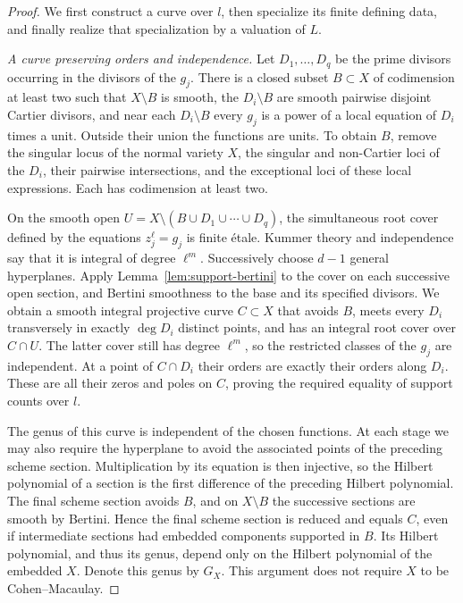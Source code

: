 \begin{proof}
We first construct a curve over $l$, then specialize its finite defining
data, and finally realize that specialization by a valuation of $L$.

\emph{A curve preserving orders and independence.}
Let $D_1,\ldots,D_q$ be the prime divisors occurring in the divisors of
the $g_j$.  There is a closed subset $B\subset X$ of codimension at least
two such that $X\setminus B$ is smooth, the $D_i\setminus B$ are smooth
pairwise disjoint Cartier divisors, and near each $D_i\setminus B$ every
$g_j$ is a power of a local equation of $D_i$ times a unit.
Outside their union the functions are units.  To obtain $B$, remove the
singular locus of the normal variety $X$, the singular and non-Cartier
loci of the $D_i$, their pairwise intersections, and the exceptional
loci of these local expressions.  Each has codimension at least two.

On the smooth open
$U=X\setminus(B\cup D_1\cup\cdots\cup D_q)$, the simultaneous root
cover defined by the equations $z_j^\ell=g_j$ is finite \'{e}tale.
Kummer theory and independence say that it is integral of degree
$\ell^m$.  Successively choose $d-1$ general hyperplanes.  Apply
Lemma~\ref{lem:support-bertini} to the cover on each successive open
section, and Bertini smoothness to the base and its specified divisors.
We obtain a smooth integral projective curve $C\subset X$ that avoids
$B$, meets every $D_i$ transversely in exactly $\deg D_i$ distinct
points, and has an integral root cover over $C\cap U$.
The latter cover still has degree $\ell^m$, so the restricted classes
of the $g_j$ are independent.  At a point of $C\cap D_i$ their orders
are exactly their orders along $D_i$.  These are all their zeros and
poles on $C$, proving the required equality of support counts over $l$.

The genus of this curve is independent of the chosen functions.
At each stage we may also require the hyperplane to avoid the associated
points of the preceding scheme section.  Multiplication by its equation
is then injective, so the Hilbert polynomial of a section is the first
difference of the preceding Hilbert polynomial.  The final scheme
section avoids $B$, and on $X\setminus B$ the successive sections are
smooth by Bertini.  Hence the final scheme section is reduced and equals
$C$, even if intermediate sections had embedded components supported
in $B$.
Its Hilbert polynomial, and thus its genus, depend only on the Hilbert
polynomial of the embedded $X$.  Denote this genus by $G_X$.
This argument does not require $X$ to be Cohen--Macaulay.


\end{proof}
